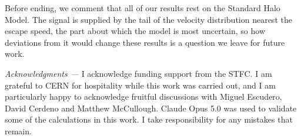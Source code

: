 \documentclass[aps,prl,twocolumn,superscriptaddress,nofootinbib,floatfix]{revtex4-2}
\newcommand{\shortsection}[1]{\emph{#1 —}}
\begin{document}
Before ending, we comment that all of our results rest on the Standard Halo Model. 
The signal is supplied by the tail of the velocity distribution nearest the escape speed, the part about which the model is most uncertain, so how deviations from it would change these results is a
question we leave for future work.

\shortsection{Acknowledgments}
I acknowledge funding support from the STFC. 
I am grateful to CERN for hospitality while this work was carried out, and I am particularly happy to acknowledge fruitful discussions with Miguel Escudero, David Cerdeno and Matthew McCullough. 
Claude Opus 5.0 was used to validate some of the calculations in this work. I take responsibility for any mistakes that remain.



\end{document}

